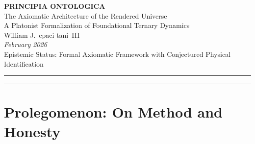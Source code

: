 \documentclass[11pt,twoside]{article}
\theoremstyle{definition}
\theoremstyle{plain}
\theoremstyle{remark}
\begin{document}
\begin{center}
    {\Huge\bfseries PRINCIPIA ONTOLOGICA}\\[8pt]
    {\Large The Axiomatic Architecture of the Rendered Universe}\\[6pt]
    {\large A Platonist Formalization of Foundational Ternary Dynamics}\\[18pt]
    {\large William J.\ cpaci-tani~III}\\[8pt]
    {\normalsize\textit{February 2026}}\\[6pt]
    {\small Epistemic Status: Formal Axiomatic Framework with Conjectured Physical Identification}
\end{center}

\vspace{1em}
\hrule height 0.6pt
\vspace{1.5em}

\begin{abstract}
\noindent We present an axiomatic ontology grounded in mathematical Platonism: the thesis that mathematical structure is ontologically prior to physical instantiation. Beginning from the single premise that a continuous, self-symmetric mathematical object (the \emph{Void}) constitutes the fundamental substrate of reality, we derive through strict logical entailment the necessity of discretization, the emergence of spatial extension, the origin of inertial mass as a \emph{projection residual}, and the thermodynamic arrow of time as irreversible information loss under projection. The framework identifies the fine-structure constant $\alpha$ with a specific algebraic invariant of the lemniscatic elliptic curve, achieving 1.26\,ppm agreement with the CODATA~2022 value from pure geometry alone. We present this identification as a conjecture whose confirmation or refutation would constitute a decisive test of mathematical Platonism in physics. Throughout, we maintain strict separation between what is proven, what is selected, and what is conjectured.
\end{abstract}

\vspace{1em}
\hrule height 0.6pt
\vspace{1.5em}

\tableofcontents
\newpage

\section*{Prolegomenon: On Method and Honesty}
\end{document}
